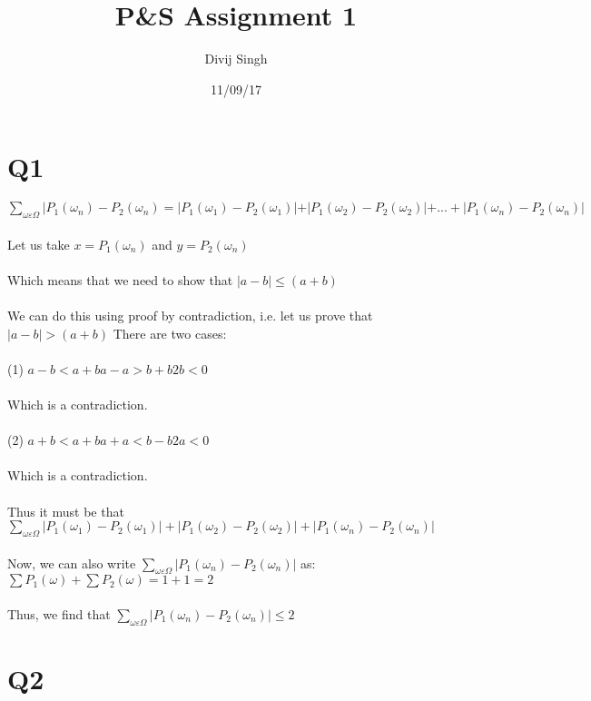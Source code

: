 \documentclass{article}
\title{P\&S Assignment 1}
\date{11/09/17}
\author{Divij Singh}
\begin{document}
	\maketitle
	
	\section{Q1}
	
		$\sum_{\omega\varepsilon\Omega}|P_1 (\omega_n) - P_2 (\omega_n)=|P_1 (\omega_1) - P_2 (\omega_1)| + |P_1 (\omega_2) - P_2 (\omega_2)| +...+ |P_1 (\omega_n) - P_2 (\omega_n)|$
		\\
		\\
		Let us take $x=P_1 (\omega_n)$ and $y=P_2(\omega_n)$
		\\
		\\
		Which means that we need to show that $|a-b| \le (a+b)$
		\\
		\\
		We can do this using proof by contradiction, i.e. let us prove that $|a-b|>(a+b)$
		There are two cases:
		\\
		\\
		(1)
			$a-b<a+b
			a-a>b+b
			2b<0$
			\\
			\\
			Which is a contradiction.
		\\
		\\
		(2)
			$a+b<a+b
			a+a<b-b
			2a<0$
			\\
			\\
			Which is a contradiction.
		\\
		\\
		Thus it must be that 
		$\sum_{\omega\varepsilon\Omega} |P_1 (\omega_1) - P_2 (\omega_1)| + |P_1 (\omega_2) - P_2 (\omega_2)| + |P_1 (\omega_n) - P_2 (\omega_n)|$
		\\
		\\
		Now, we can also write $\sum_{\omega\varepsilon\Omega}|P_1 (\omega_n) - P_2 (\omega_n)|$ as:
		$\sum P_1(\omega) + \sum P_2(\omega)
		= 1+1
		=2$
		\\
		\\
		Thus, we find that $\sum_{\omega\varepsilon\Omega}|P_1 (\omega_n) - P_2 (\omega_n)| \le 2$
		
	\section{Q2}
	
\end{document}
